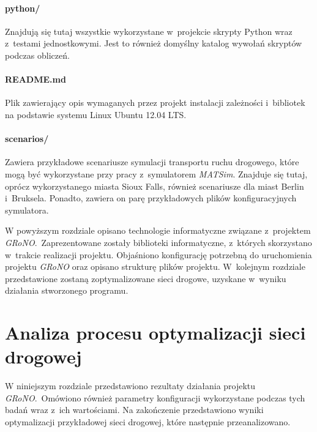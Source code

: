 \documentclass[twoside,12pt]{report}
\let\oldsection\chapter
\def\chapter{\cleardoublepage\oldsection}
\begin{document}
\subsubsection{python/}
Znajdują się tutaj wszystkie wykorzystane w~projekcie skrypty Python wraz z~testami jednostkowymi. Jest to również domyślny katalog wywołań skryptów podczas obliczeń.

\subsubsection{README.md}
Plik zawierający opis wymaganych przez projekt instalacji zależności i~bibliotek na podstawie systemu Linux Ubuntu 12.04 LTS.

\subsubsection{scenarios/}
Zawiera przykładowe scenariusze symulacji transportu ruchu drogowego, które mogą być wykorzystane przy pracy z~symulatorem \textit{MATSim}. Znajduje się tutaj, oprócz wykorzystanego miasta Sioux Falls, również scenariusze dla miast Berlin i~Bruksela. Ponadto, zawiera on parę przykładowych plików konfiguracyjnych symulatora.
\newline


W powyższym rozdziale opisano technologie informatyczne związane z~projektem \textit{GRoNO}.~Zaprezentowane zostały biblioteki informatyczne, z~których skorzystano w~trakcie realizacji projektu. Objaśniono konfigurację potrzebną do uruchomienia projektu \textit{GRoNO} oraz opisano strukturę plików projektu. W~kolejnym rozdziale przedstawione zostaną zoptymalizowane sieci drogowe, uzyskane w~wyniku działania stworzonego programu.

\chapter{Analiza procesu optymalizacji sieci drogowej}\label{rozdz.grono-praktyka} 
W niniejszym rozdziale przedstawiono rezultaty działania projektu \textit{GRoNO}.~Omówiono również parametry konfiguracji wykorzystane podczas tych badań wraz z~ich wartościami. Na zakończenie przedstawiono wyniki optymalizacji przykładowej sieci drogowej, które następnie przeanalizowano.
\end{document}
